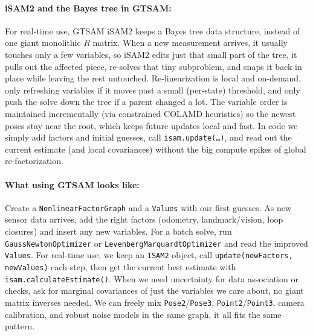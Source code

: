 \paragraph{iSAM2 and the Bayes tree in GTSAM:}
For real-time use, GTSAM iSAM2 keeps a Bayes tree data structure, instead of one giant monolithic $R$ matrix. When a new measurement arrives, it usually touches only a few variables, so iSAM2 edits just that small part of the tree, it pulls out the affected piece, re-solves that tiny subproblem, and snaps it back in place while leaving the rest untouched. Re-linearization is local and on-demand, only refreshing variables if it moves past a small (per-state) threshold, and only push the solve down the tree if a parent changed a lot. The variable order is maintained incrementally (via constrained COLAMD heuristics) so the newest poses stay near the root, which keeps future updates local and fast. In code we simply add factors and initial guesses, call \texttt{isam.update(\dots)}, and read out the current estimate (and local covariances) without the big compute spikes of global re-factorization. \cite{GTSAM_handbook}

\paragraph{What using GTSAM looks like:}
Create a \texttt{NonlinearFactorGraph} and a \texttt{Values} with our first guesses. As new sensor data arrives, add the right factors (odometry, landmark/vision, loop closures) and insert any new variables. For a batch solve, run \texttt{GaussNewtonOptimizer} or \texttt{LevenbergMarquardtOptimizer} and read the improved \texttt{Values}. For real-time use, we keep an \texttt{ISAM2} object, call \texttt{update(newFactors, newValues)} each step, then get the current best estimate with \texttt{isam.calculateEstimate()}. When we need uncertainty for data association or checks, ask for marginal covariances of just the variables we care about, no giant matrix inverses needed. We can freely mix \texttt{Pose2}/\texttt{Pose3}, \texttt{Point2}/\texttt{Point3}, camera calibration, and robust noise models in the same graph, it all fits the same pattern. \cite{GTSAM_handbook}

